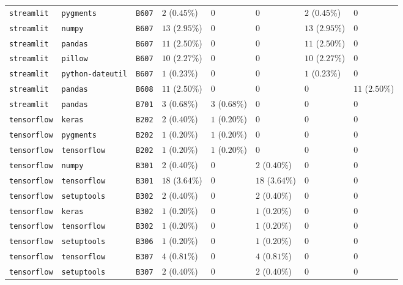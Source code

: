 \begin{table}
\begin{tabular}{llllllll}
\texttt{streamlit} & \texttt{pygments} & \texttt{B607} & $2$ ($0.45\%$) & $0$ & $0$ & $2$ ($0.45\%$) & $0$ \\
\texttt{streamlit} & \texttt{numpy} & \texttt{B607} & $13$ ($2.95\%$) & $0$ & $0$ & $13$ ($2.95\%$) & $0$ \\
\texttt{streamlit} & \texttt{pandas} & \texttt{B607} & $11$ ($2.50\%$) & $0$ & $0$ & $11$ ($2.50\%$) & $0$ \\
\texttt{streamlit} & \texttt{pillow} & \texttt{B607} & $10$ ($2.27\%$) & $0$ & $0$ & $10$ ($2.27\%$) & $0$ \\
\texttt{streamlit} & \texttt{python-dateutil} & \texttt{B607} & $1$ ($0.23\%$) & $0$ & $0$ & $1$ ($0.23\%$) & $0$ \\
\texttt{streamlit} & \texttt{pandas} & \texttt{B608} & $11$ ($2.50\%$) & $0$ & $0$ & $0$ & $11$ ($2.50\%$) \\
\texttt{streamlit} & \texttt{pandas} & \texttt{B701} & $3$ ($0.68\%$) & $3$ ($0.68\%$) & $0$ & $0$ & $0$ \\
\texttt{tensorflow} & \texttt{keras} & \texttt{B202} & $2$ ($0.40\%$) & $1$ ($0.20\%$) & $0$ & $0$ & $0$ \\
\texttt{tensorflow} & \texttt{pygments} & \texttt{B202} & $1$ ($0.20\%$) & $1$ ($0.20\%$) & $0$ & $0$ & $0$ \\
\texttt{tensorflow} & \texttt{tensorflow} & \texttt{B202} & $1$ ($0.20\%$) & $1$ ($0.20\%$) & $0$ & $0$ & $0$ \\
\texttt{tensorflow} & \texttt{numpy} & \texttt{B301} & $2$ ($0.40\%$) & $0$ & $2$ ($0.40\%$) & $0$ & $0$ \\
\texttt{tensorflow} & \texttt{tensorflow} & \texttt{B301} & $18$ ($3.64\%$) & $0$ & $18$ ($3.64\%$) & $0$ & $0$ \\
\texttt{tensorflow} & \texttt{setuptools} & \texttt{B302} & $2$ ($0.40\%$) & $0$ & $2$ ($0.40\%$) & $0$ & $0$ \\
\texttt{tensorflow} & \texttt{keras} & \texttt{B302} & $1$ ($0.20\%$) & $0$ & $1$ ($0.20\%$) & $0$ & $0$ \\
\texttt{tensorflow} & \texttt{tensorflow} & \texttt{B302} & $1$ ($0.20\%$) & $0$ & $1$ ($0.20\%$) & $0$ & $0$ \\
\texttt{tensorflow} & \texttt{setuptools} & \texttt{B306} & $1$ ($0.20\%$) & $0$ & $1$ ($0.20\%$) & $0$ & $0$ \\
\texttt{tensorflow} & \texttt{tensorflow} & \texttt{B307} & $4$ ($0.81\%$) & $0$ & $4$ ($0.81\%$) & $0$ & $0$ \\
\texttt{tensorflow} & \texttt{setuptools} & \texttt{B307} & $2$ ($0.40\%$) & $0$ & $2$ ($0.40\%$) & $0$ & $0$ \\

\end{tabular}
\end{table}

